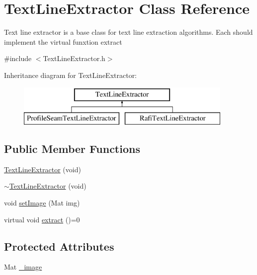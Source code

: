\hypertarget{class_text_line_extractor}{\section{Text\+Line\+Extractor Class Reference}
\label{class_text_line_extractor}
}


Text line extractor is a base class for text line extraction algorithms. Each should implement the virtual funxtion extract  




{\ttfamily \#include $<$Text\+Line\+Extractor.\+h$>$}

Inheritance diagram for Text\+Line\+Extractor\+:\begin{figure}[H]
\begin{center}
\leavevmode
\includegraphics[height=2.000000cm]{class_text_line_extractor}
\end{center}
\end{figure}
\subsection*{Public Member Functions}
\begin{DoxyCompactItemize}
\item 
\hyperlink{class_text_line_extractor_a5f0c3627efd8b25b82e747a191b21d54}{Text\+Line\+Extractor} (void)
\item 
\hyperlink{class_text_line_extractor_a220ed917eeb0ded278f9a08539149623}{$\sim$\+Text\+Line\+Extractor} (void)
\item 
void \hyperlink{class_text_line_extractor_a67f7e8bdb62bff99de9816b55de4c6d0}{set\+Image} (Mat img)
\item 
virtual void \hyperlink{class_text_line_extractor_ae3e60f7dfccd378b6144510b5b85104f}{extract} ()=0
\end{DoxyCompactItemize}
\subsection*{Protected Attributes}
\begin{DoxyCompactItemize}
\item 
Mat \hyperlink{class_text_line_extractor_acc518adbefc6a211ce84f5124da31709}{\+\_\+image}
\end{DoxyCompactItemize}


